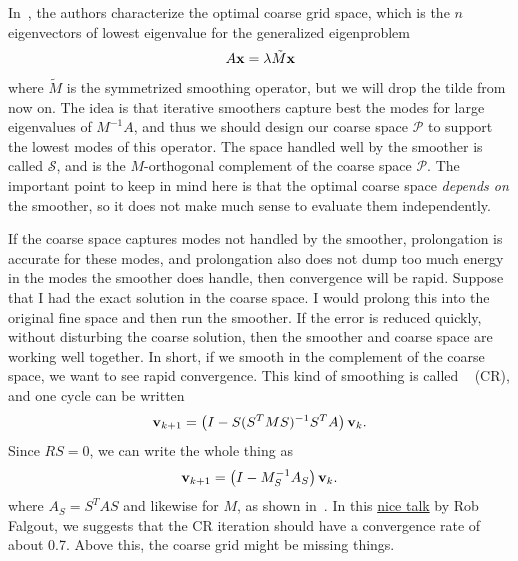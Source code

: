 \begin{refsection}
In~\parencite{BrannickEtAl2018}, the authors characterize the optimal coarse grid space, which is the $n$ eigenvectors of lowest eigenvalue for the generalized eigenproblem
\begin{align}
  A \vb{x} = \lambda \tilde M \vb{x}
\end{align}
where $\tilde M$ is the symmetrized smoothing operator, but we will drop the tilde from now on. The idea is that iterative smoothers capture best the modes for large eigenvalues of $M^{-1} A$, and thus we should design our coarse space $\mathcal{P}$ to support the lowest modes of this operator. The space handled well by the smoother is called $\mathcal{S}$, and is the $M$-orthogonal complement of the coarse space $\mathcal{P}$. The important point to keep in mind here is that the optimal coarse space \textit{depends on} the smoother, so it does not make much sense to evaluate them independently.

If the coarse space captures modes not handled by the smoother, prolongation is accurate for these modes, and prolongation also does not dump too much energy in the modes the smoother does handle, then convergence will be rapid. Suppose that I had the exact solution in the coarse space. I would prolong this into the original fine space and then run the smoother. If the error is reduced quickly, without disturbing the coarse solution, then the smoother and coarse space are working well together. In short, if we smooth in the complement of the coarse space, we want to see rapid convergence. This kind of smoothing is called ~\parencite{Brandt2000,BrannickFalgout2007} (CR), and one cycle can be written
\begin{align}
  \vb{v}_{k+1} = \left( I - S (S^T M S)^{-1} S^T A \right) \vb{v}_k.
\end{align}
Since $R S = 0$, we can write the whole thing as
\begin{align}
  \vb{v}_{k+1} = \left( I - M_S^{-1} A_S \right) \vb{v}_k.
\end{align}
where $A_S = S^T A S$ and likewise for $M$, as shown in~\parencite{BrannickEtAl2018}. In this \href{https://www.ima.umn.edu/materials/2010-2011/W11.29-12.3.10/10309/ima-2010-cr-v3.pdf}{nice talk} by Rob Falgout, we suggests that the CR iteration should have a convergence rate of about 0.7. Above this, the coarse grid might be missing things.


\end{refsection}
